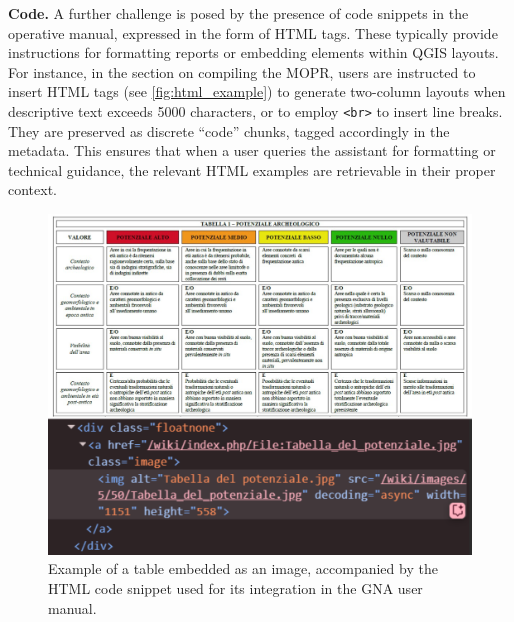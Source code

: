 \begin{spacing}{1.5}
\textbf{Code. }A further challenge is posed by the presence of code snippets in the operative manual, expressed in the form of HTML tags. These typically provide instructions for formatting reports or embedding elements within QGIS layouts. For instance, in the section on compiling the MOPR, users are instructed to insert HTML tags (see \autoref{fig:html_example}) to generate two-column layouts when descriptive text exceeds 5000 characters, or to employ \texttt{<br>} to insert line breaks. They are preserved as discrete ``code'' chunks, tagged accordingly in the metadata. This ensures that when a user queries the assistant for formatting or technical guidance, the relevant HTML examples are retrievable in their proper context.\\

\begin{figure}[H]
  \centering
  \includegraphics[width=\textwidth]{images/merged.jpg} 
  \caption{Example of a table embedded as an image, accompanied by the HTML code
snippet used for its integration in the GNA user manual.}
  \label{fig:example_image}
\end{figure}


\end{spacing}
